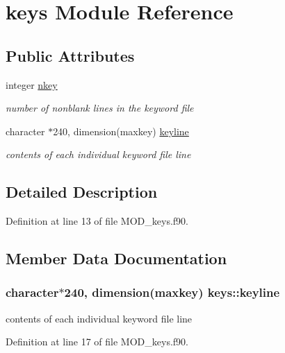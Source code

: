 \hypertarget{classkeys}{\section{keys Module Reference}
\label{classkeys}
}
\subsection*{Public Attributes}
\begin{DoxyCompactItemize}
\item 
integer \hyperlink{classkeys_a1568aa5defa6d3cd4617ed36cf50a39d}{nkey}
\begin{DoxyCompactList}\small\item\em number of nonblank lines in the keyword file \end{DoxyCompactList}\item 
character $\ast$240, dimension(maxkey) \hyperlink{classkeys_af974c50af6bc4f474384769427256b5e}{keyline}
\begin{DoxyCompactList}\small\item\em contents of each individual keyword file line \end{DoxyCompactList}\end{DoxyCompactItemize}


\subsection{Detailed Description}


Definition at line 13 of file M\-O\-D\-\_\-keys.\-f90.



\subsection{Member Data Documentation}
\hypertarget{classkeys_af974c50af6bc4f474384769427256b5e}{
\subsubsection[{keyline}]{\setlength{\rightskip}{0pt plus 5cm}character$\ast$240, dimension(maxkey) keys\-::keyline}}\label{classkeys_af974c50af6bc4f474384769427256b5e}


contents of each individual keyword file line 



Definition at line 17 of file M\-O\-D\-\_\-keys.\-f90.

